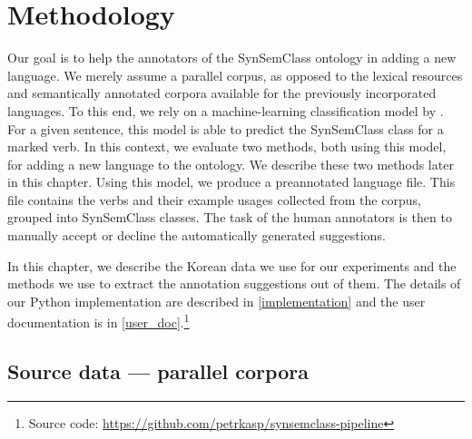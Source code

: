 \chapter{Methodology}
\label{chap:methodology}

Our goal is to help the annotators of the SynSemClass ontology in adding a new language. We merely assume a parallel corpus, as opposed to the lexical resources and semantically annotated corpora available for the previously incorporated languages. To this end, we rely on a machine-learning classification model by \citet{SSC_LLM_Suggestions}. For a given sentence, this model is able to predict the SynSemClass class for a marked verb. In this context, we evaluate two methods, both using this model, for adding a new language to the ontology. We describe these two methods later in this chapter. Using this model, we produce a preannotated language file. This file contains the verbs and their example usages collected from the corpus, grouped into SynSemClass classes. The task of the human annotators is then to manually accept or decline the automatically generated suggestions.

In this chapter, we describe the Korean data we use for our experiments and the methods we use to extract the annotation suggestions out of them. The details of our Python implementation are described in \cref{implementation} and the user documentation is in \cref{user_doc}.\footnote{Source code: \url{https://github.com/petrkasp/synsemclass-pipeline}}

\section{Source data --- parallel corpora}
\label{sec:data}

